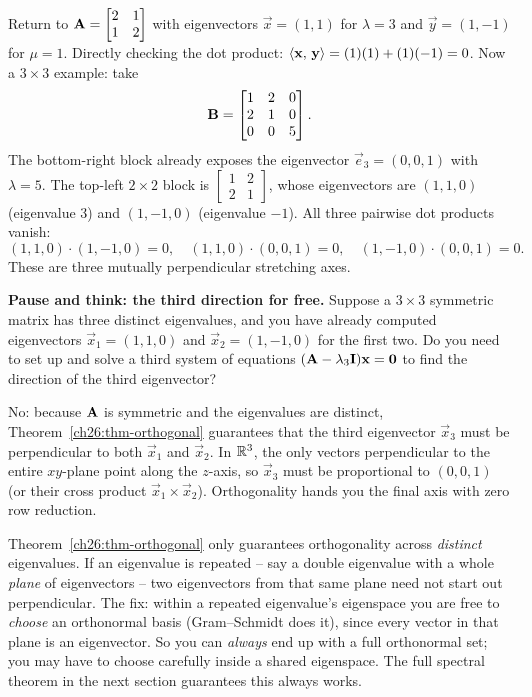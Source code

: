 \begin{example}
\label{ch26:ex-ortho}
Return to $\mathbf{A}=\begin{bmatrix}2&1\\1&2\end{bmatrix}$ with eigenvectors
$\vec{x}=(1,1)$ for $\lambda=3$ and $\vec{y}=(1,-1)$ for $\mu=1$. Directly checking
the dot product: $\langle \mathbf{x},\, \mathbf{y} \rangle = (1)(1)+(1)(-1) = 0$. Now a $3\times 3$ example: take
\[
  \mathbf{B} = \begin{bmatrix} 1 & 2 & 0 \\ 2 & 1 & 0 \\ 0 & 0 & 5 \end{bmatrix}.
\]
The bottom-right block already exposes the eigenvector $\vec{e}_3=(0,0,1)$ with
$\lambda=5$. The top-left $2\times 2$ block is $\begin{bmatrix}1&2\\2&1\end{bmatrix}$,
whose eigenvectors are $(1,1,0)$ (eigenvalue $3$) and $(1,-1,0)$ (eigenvalue
$-1$). All three pairwise dot products vanish:
\[
  (1,1,0)\cdot(1,-1,0)=0,\quad (1,1,0)\cdot(0,0,1)=0,\quad (1,-1,0)\cdot(0,0,1)=0.
\]
These are three mutually perpendicular stretching axes.
\end{example}

\begin{recoverybox}
\textbf{Pause and think: the third direction for free.} Suppose a $3\times 3$
symmetric matrix has three distinct eigenvalues, and you have already computed
eigenvectors $\vec{x}_1 = (1, 1, 0)$ and $\vec{x}_2 = (1, -1, 0)$ for the
first two. Do you need to set up and solve a third system of equations
$(\mathbf{A} - \lambda_3\mathbf{I})\mathbf{x} = \mathbf{0}$ to find the direction of the
third eigenvector?

No: because $\mathbf{A}$ is symmetric and the eigenvalues are distinct,
Theorem~\ref{ch26:thm-orthogonal} guarantees that the third eigenvector
$\vec{x}_3$ must be perpendicular to both $\vec{x}_1$ and $\vec{x}_2$. In
$\mathbb{R}^3$, the only vectors perpendicular to the entire $xy$-plane point along the
$z$-axis, so $\vec{x}_3$ must be proportional to $(0, 0, 1)$ (or their cross
product $\vec{x}_1 \times \vec{x}_2$). Orthogonality hands you the final axis
with zero row reduction.
\end{recoverybox}

\begin{trapbox}
Theorem~\ref{ch26:thm-orthogonal} only guarantees orthogonality across
\emph{distinct} eigenvalues. If an eigenvalue is repeated -- say a double
eigenvalue with a whole \emph{plane} of eigenvectors -- two eigenvectors from that
same plane need not start out perpendicular. The fix: within
a repeated eigenvalue's eigenspace you are free to \emph{choose} an orthonormal
basis (Gram--Schmidt does it), since every vector in that plane is an
eigenvector. So you can \emph{always} end up with a full
orthonormal set; you may have to choose carefully inside a shared eigenspace. The
full spectral theorem in the next section guarantees this always works.
\end{trapbox}

